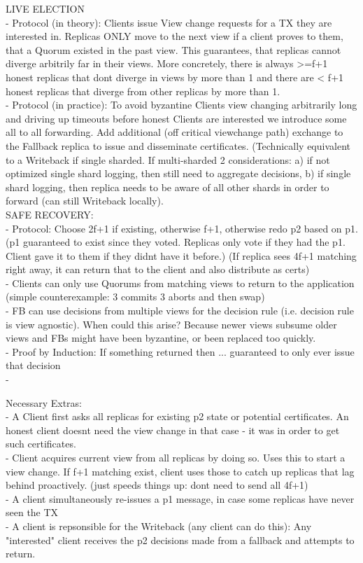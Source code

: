 LIVE ELECTION\\
- Protocol (in theory): Clients issue View change requests for a TX they are interested in. Replicas ONLY move to the next view if a client proves to them, that a Quorum existed in the past view. This guarantees, that replicas cannot diverge arbitrily far in their views. More concretely, there is always >=f+1 honest replicas that dont diverge in views by more than 1 and there are < f+1 honest replicas that diverge from other replicas by more than 1.\\


- Protocol (in practice): To avoid byzantine Clients view changing arbitrarily long and driving up timeouts before honest Clients are interested we introduce some all to all forwarding.
Add additional (off critical viewchange path) exchange to the Fallback replica to issue and disseminate certificates. (Technically equivalent to a Writeback if single sharded. If multi-sharded 2 considerations: a) if not optimized single shard logging, then still need to aggregate decisions, b) if single shard logging, then replica needs to be aware of all other shards in order to forward (can still Writeback locally).\\

SAFE RECOVERY:\\
- Protocol: Choose 2f+1 if existing, otherwise f+1, otherwise redo p2 based on p1. (p1 guaranteed to exist since they voted. Replicas only vote if they had the p1. Client gave it to them if they didnt have it before.) (If replica sees 4f+1 matching right away, it can return that to the client and also distribute as certs)\\
- Clients can only use Quorums from matching views to return to the application (simple counterexample: 3 commits 3 aborts and then swap)\\
- FB can use decisions from multiple views for the decision rule (i.e. decision rule is view agnostic). When could this arise? Because newer views subsume older views and FBs might have been byzantine, or been replaced too quickly. \\
- Proof by Induction: If something returned then ... guaranteed to only ever issue that decision\\
- 



Necessary Extras:\\
- A Client first asks all replicas for existing p2 state or potential certificates. An honest client doesnt need the view change in that case - it was in order to get such certificates.\\
- Client acquires current view from all replicas by doing so. Uses this to start a view change. If f+1 matching exist, client uses those to catch up replicas that lag behind proactively. (just speeds things up: dont need to send all 4f+1)\\
- A client simultaneously re-issues a p1 message, in case some replicas have never seen the TX\\
- A client is repsonsible for the Writeback (any client can do this): Any "interested" client receives the p2 decisions made from a fallback and attempts to return. \\


